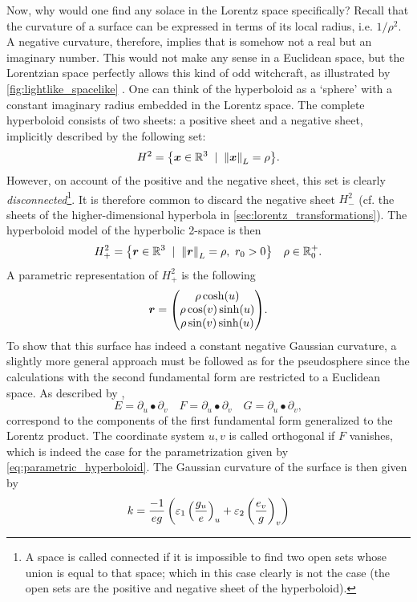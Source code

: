 Now, why would one find any solace in the Lorentz space specifically? Recall that the curvature of a surface can be expressed in terms of its local radius, i.e. \(1/\rho^2\). A negative curvature, therefore, implies that  is somehow not a real but an imaginary number. This would not make any sense in a Euclidean space, but the Lorentzian space perfectly allows this kind of odd witchcraft, as illustrated by \cref{fig:lightlike_spacelike} \cite{Ratcliffe2019}. One can think of the hyperboloid as a `sphere' with a constant imaginary radius embedded in the Lorentz space. The complete hyperboloid consists of two sheets: a positive sheet and a negative sheet, implicitly described by the following set: 
\[ H^2 = \qty{\vec{x} \in \real^3\;\mid\;\lnorm{\vec{x}} = \rho}. \]
However, on account of the positive and the negative sheet, this set is clearly \emph{disconnected}\footnote{A space is called connected if it is impossible to find two open sets whose union is equal to that space; which in this case clearly is not the case (the open sets are the positive and negative sheet of the hyperboloid).}. It is therefore common to discard the negative sheet \(H^2_-\) (cf. the sheets of the higher-dimensional hyperbola in \cref{sec:lorentz_transformations}). The hyperboloid model of the hyperbolic 2-space is then \cite{Ratcliffe2019}
\[ H^2_+ = \qty{\vec{r} \in \real^3\;\mid\;\lnorm{\vec{r}} = \rho,\ r_0 > 0} \quad \rho \in \real^+_0. \]
A parametric representation of \(H^2_+\) is the following
\begin{equation}
    \vec{r} = \mqty(\rho\cosh(u)\\\rho\cos(v)\sinh(u)\\\rho\sin(v)\sinh(u)).
    \label{eq:parametric_hyperboloid}
\end{equation}
To show that this surface has indeed a constant negative Gaussian curvature, a slightly more general approach must be followed as for the pseudosphere since the calculations with the second fundamental form are restricted to a Euclidean space. As described by \citet{ONeill1983},
\[ E = \partial_u \bullet \partial_v \quad F = \partial_u \bullet \partial_v \quad G = \partial_u \bullet \partial_v, \]
correspond to the components of the first fundamental form generalized to the Lorentz product. The coordinate system \(u, v\) is called orthogonal if \(F\) vanishes, which is indeed the case for the parametrization given by \cref{eq:parametric_hyperboloid}.
The Gaussian curvature of the surface is then given by \cite{ONeill1983}
\begin{equation}
    k = \frac{-1}{eg}
    \left(\varepsilon_1\,\qty(\frac{g_u}{e})_u + \varepsilon_2\,\qty(\frac{e_v}{g})_v\right)
    \label{eq:orthogonal_gaussian_curvature}
\end{equation}
